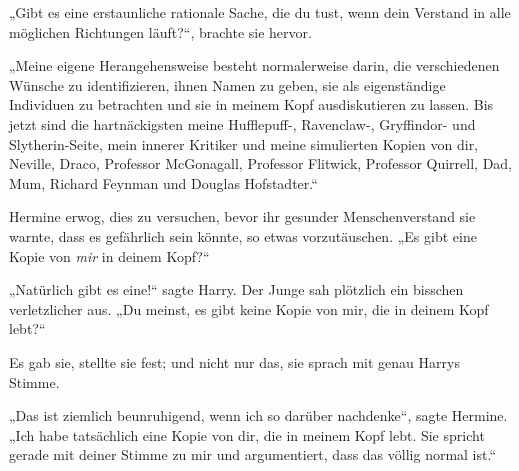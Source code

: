 „Gibt es eine erstaunliche rationale Sache, die du tust, wenn dein Verstand in alle möglichen Richtungen läuft?“, brachte sie hervor.

„Meine eigene Herangehensweise besteht normalerweise darin, die verschiedenen Wünsche zu identifizieren, ihnen Namen zu geben, sie als eigenständige Individuen zu betrachten und sie in meinem Kopf ausdiskutieren zu lassen. Bis jetzt sind die hartnäckigsten meine Hufflepuff-, Ravenclaw-, Gryffindor- und Slytherin-Seite, mein innerer Kritiker und meine simulierten Kopien von dir, Neville, Draco, Professor McGonagall, Professor Flitwick, Professor Quirrell, Dad, Mum, Richard Feynman und Douglas Hofstadter.“

Hermine erwog, dies zu versuchen, bevor ihr gesunder Menschenverstand sie warnte, dass es gefährlich sein könnte, so etwas vorzutäuschen.
„Es gibt eine Kopie von \emph{mir} in deinem Kopf?“

„Natürlich gibt es eine!“ sagte Harry. Der Junge sah plötzlich ein bisschen verletzlicher aus.
„Du meinst, es gibt keine Kopie von mir, die in deinem Kopf lebt?“

Es gab sie, stellte sie fest; und nicht nur das, sie sprach mit genau Harrys Stimme.

„Das ist ziemlich beunruhigend, wenn ich so darüber nachdenke“, sagte Hermine.
„Ich habe tatsächlich eine Kopie von dir, die in meinem Kopf lebt. Sie spricht gerade mit deiner Stimme zu mir und argumentiert, dass das völlig normal ist.“

